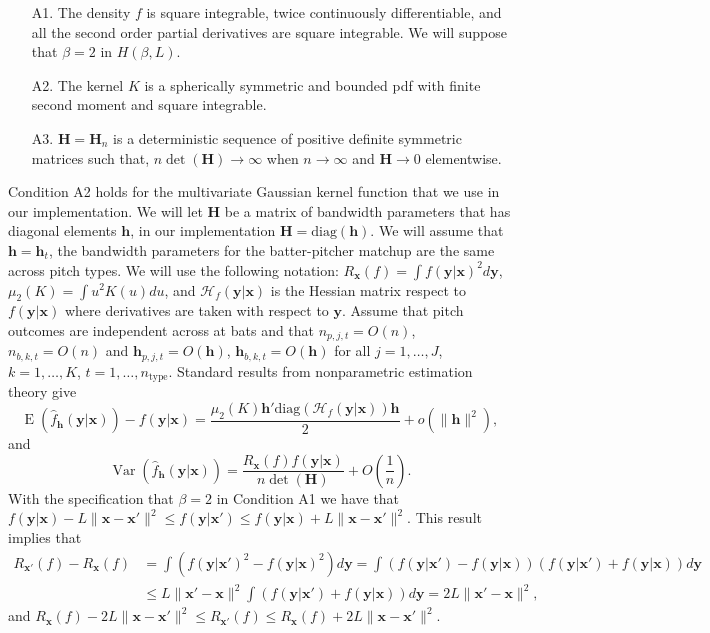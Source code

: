 \documentclass[12pt]{article}
\newcommand{\Hcal}{\mathcal{H}}
\newcommand{\Hbf}{\textbf{H}}
\newcommand{\y}{\textbf{y}}
\newcommand{\x}{\textbf{x}}
\newcommand{\h}{\textbf{h}}
\DeclareMathOperator{\E}{E}
\DeclareMathOperator{\Var}{Var}
\begin{document}
\begin{itemize}
\item[A1.] The density $f$ is square integrable, twice continuously differentiable, and all the second order partial derivatives are square integrable. We will suppose that $\beta = 2$ in $H(\beta,L)$.
\item[A2.] The kernel $K$ is a spherically symmetric and bounded pdf with finite second moment and square integrable.
\item[A3.] $\Hbf = \Hbf_n$ is a deterministic sequence of positive definite symmetric matrices such that, $n\det(\Hbf) \to \infty$ when $n \to \infty$ and $\Hbf \to 0$ elementwise. 
\end{itemize}

Condition A2 holds for the multivariate Gaussian kernel function that we use in our implementation. We will let $\Hbf$ be a matrix of bandwidth parameters that has diagonal elements $\h$, in our implementation $\Hbf = \text{diag}(\h)$. We will assume that $\h = \h_t$, the bandwidth parameters for the batter-pitcher matchup are the same across pitch types. We will use the following notation: $R_{\x}(f) = \int f(\y|\x)^2 d\y$, $\mu_2(K) = \int u^2K(u)du$, and $\Hcal_f(\y|\x)$ is the Hessian matrix respect to $f(\y|\x)$ where derivatives are taken with respect to $\y$. Assume that pitch outcomes are independent across at bats and that $n_{p,j,t} = O(n)$, $n_{b,k,t} = O(n)$ and $\h_{p,j,t} = O(\h)$, $\h_{b,k,t} = O(\h)$ for all $j = 1, \ldots, J$, $k = 1, \ldots, K$, $t = 1,\ldots,n_{\text{type}}$. Standard results from nonparametric estimation theory give
$$
  \E(\hat f_\h(\y|\x)) - f(\y|\x) = \frac{\mu_2(K)\h'\text{diag}(\Hcal_f(\y|\x))\h}{2} 
    + o(\|\h\|^2),
$$
and
$$
 \Var(\hat f_\h(\y|\x)) = \frac{R_{\x}(f)f(\y|\x)}{n\det(\Hbf)} + O\left(\frac{1}{n}\right).
$$
With the specification that $\beta = 2$ in Condition A1 we have that 
$
   f(\y|\x) - L\|\x-\x'\|^2 \leq f(\y|\x') \leq f(\y|\x) + L\|\x-\x'\|^2.
$
This result implies that
\begin{align*}
  R_{\x'}(f) - R_\x(f) &= \int (f(\y|\x')^2 - f(\y|\x)^2) d\y 
     = \int (f(\y|\x') - f(\y|\x))(f(\y|\x') + f(\y|\x)) d\y \\
  &\leq L\|\x'-\x\|^2 \int(f(\y|\x') + f(\y|\x)) d\y 
    = 2L\|\x'-\x\|^2,
\end{align*}
and 
$
   R_\x(f) - 2L\|\x-\x'\|^2 \leq R_{\x'}(f) \leq R_\x(f) + 2L\|\x-\x'\|^2.
$ 
\end{document}
